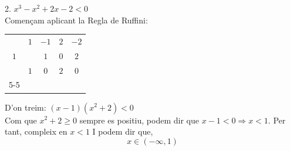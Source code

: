 2. $x^3 - x^2 + 2x - 2 < 0$ \\

Començam aplicant la Regla de Ruffini:

\begin{center}
\begin{tabular}{c|cccc}
  & $1$ & $-1$ & $2$ & $-2$ \\
$1$ &  & $1$ & $0$ & $2$ \\ 
\hline
  & $1$ & $0$ & $2$ & \multicolumn{1}{|c}{$0$}\\
\cline{5-5} 
\end{tabular}
\end{center}

D'on treim: $(x - 1)(x^2 + 2) < 0$\\
Com que $x^2 + 2 \geq 0$ sempre es positiu, podem dir que $x - 1 < 0 \Rightarrow x < 1$. Per tant, compleix en $x < 1$
I podem dir que,
\begin{equation*}
x \in(- \infty, 1)
\end{equation*}
